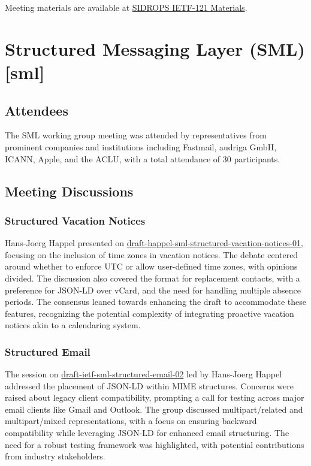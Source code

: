 \documentclass{article}
\begin{document}
Meeting materials are available at \href{https://example.com/sidrops-ietf121-materials}{SIDROPS IETF-121 Materials}.



\newpage

\section{Structured Messaging Layer (SML) [sml]}

\subsection{Attendees}

The SML working group meeting was attended by representatives from prominent companies and institutions including Fastmail, audriga GmbH, ICANN, Apple, and the ACLU, with a total attendance of 30 participants.

\subsection{Meeting Discussions}

\subsubsection{Structured Vacation Notices}

Hans-Joerg Happel presented on \href{https://datatracker.ietf.org/doc/html/draft-happel-sml-structured-vacation-notices-01}{draft-happel-sml-structured-vacation-notices-01}, focusing on the inclusion of time zones in vacation notices. The debate centered around whether to enforce UTC or allow user-defined time zones, with opinions divided. The discussion also covered the format for replacement contacts, with a preference for JSON-LD over vCard, and the need for handling multiple absence periods. The consensus leaned towards enhancing the draft to accommodate these features, recognizing the potential complexity of integrating proactive vacation notices akin to a calendaring system.

\subsubsection{Structured Email}

The session on \href{https://datatracker.ietf.org/doc/html/draft-ietf-sml-structured-email-02}{draft-ietf-sml-structured-email-02} led by Hans-Joerg Happel addressed the placement of JSON-LD within MIME structures. Concerns were raised about legacy client compatibility, prompting a call for testing across major email clients like Gmail and Outlook. The group discussed multipart/related and multipart/mixed representations, with a focus on ensuring backward compatibility while leveraging JSON-LD for enhanced email structuring. The need for a robust testing framework was highlighted, with potential contributions from industry stakeholders.
\end{document}
